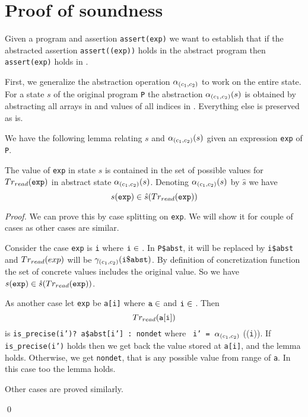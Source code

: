 \section{ Proof of soundness}

Given a program \prog and assertion {\tt assert(exp)} we want to
establish that if the abstracted assertion {\tt assert(\trrd(exp))}
holds in the abstract program \progabst then {\tt assert(exp)} holds
in \prog.

First, we
generalize the abstraction operation \(\alpha_{(c_1,c_2)}\) to work on the entire
state. For a state \(s\) of the original program {\tt P} the
abstraction \(\alpha_{(c_1,c_2)}(s)\) is obtained by abstracting all arrays in
\arrayids{} and values of all indices in \indexids. Everything else is
preserved as is.

We have the following lemma relating \(s\) and \(\alpha_{(c_1,c_2)}(s)\) given an
expression {\tt exp} of {\tt P}.

\begin{lemma}

The value of {\tt exp} in state \(s\) is contained in the set of
possible values for \(Tr_{read}({\tt exp})\) in abstract state
\(\alpha_{(c_1,c_2)}(s)\). Denoting \(\alpha_{(c_1,c_2)}(s)\) by \(\hat{s}\) we have \[s({\tt exp}) \in \hat{s}(Tr_{read}({\tt exp}))\]
  
\end{lemma}

\begin{proof}

We can prove this by case splitting on {\tt exp}. We will show it
for couple of cases as other cases are similar.

 Consider the case {\tt exp} is {\tt i} where \({\tt i} \in\)
 \indexids. In {\tt P\$abst}, it will be replaced by {\tt i\$abst} and
 \(Tr_{read}(exp)\) will be \(\gamma_{(c_1,c_2)}({\tt i\$abst})\). By definition of
 concretization function the set of concrete values includes the
 original value. So we have \(s({\tt exp}) \in \hat{s}(Tr_{read}({\tt exp}))\).

 As another case let {\tt exp} be {\tt a[i]} where \({\tt a} \in\)
 \arrayids{} and \({\tt i} \in\) \indexids. Then \[Tr_{read}({\tt
   a[i]})\] is {\tt is\_precise(i’)? a\$abst[i’] : nondet} where {\tt
   i’ = }\(\alpha_{(c_1,c_2)}\) (\trrd ({\tt i})). If {\tt is\_precise(i’)} holds
 then we get back the value stored at {\tt a[i]}, and the lemma
 holds. Otherwise, we get {\tt nondet}, that is any possible value
 from range of {\tt a}. In this case too the lemma holds.

 Other cases are proved similarly.
 
 \qed
  
\end{proof}

